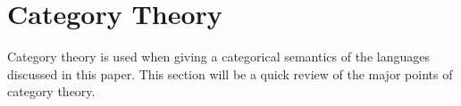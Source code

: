 \section{Category Theory}
Category theory is used when giving a categorical semantics of the languages
discussed in this paper. This section will be a quick review of the major 
points of category theory.

